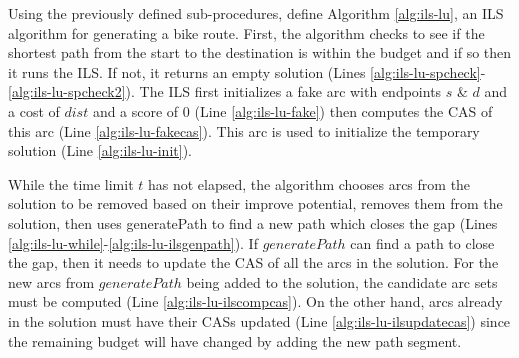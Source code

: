 \documentclass[11pt]{article}
\begin{document}
Using the previously defined sub-procedures, \citeauthor{lu2015arc} define Algorithm \ref{alg:ils-lu}, an ILS algorithm for generating a bike route. First, the algorithm checks to see if the shortest path from the start to the destination is within the budget and if so then it runs the ILS. If not, it returns an empty solution (Lines \ref{alg:ils-lu-spcheck}-\ref{alg:ils-lu-spcheck2}). The ILS first initializes a fake arc with endpoints $s$ \& $d$ and a cost of $dist$ and a score of 0 (Line \ref{alg:ils-lu-fake}) then computes the CAS of this arc (Line \ref{alg:ils-lu-fakecas}). This arc is used to initialize the temporary solution (Line \ref{alg:ils-lu-init}).

While the time limit $t$ has not elapsed, the algorithm chooses arcs from the solution to be removed based on their improve potential, removes them from the solution, then uses generatePath to find a new path which closes the gap (Lines \ref{alg:ils-lu-while}-\ref{alg:ils-lu-ilsgenpath}). If $generatePath$ can find a path to close the gap, then it needs to update the CAS of all the arcs in the solution. For the new arcs from $generatePath$ being added to the solution, the candidate arc sets must be computed (Line \ref{alg:ils-lu-ilscompcas}). On the other hand, arcs already in the solution must have their CASs updated (Line \ref{alg:ils-lu-ilsupdatecas}) since the remaining budget will have changed by adding the new path segment. 
\end{document}
